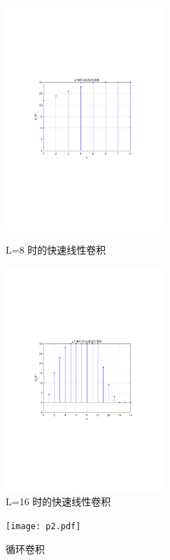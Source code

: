 \documentclass[12pt,AutoFakeBold]{article}
\begin{document}
\begin{figure}[htbp]
	\centering
	\begin{minipage}[t]{0.48\textwidth}
		\centering
		\includegraphics[width=6cm]{figure/p11.pdf}
		\caption{L=8 时的快速线性卷积} \label{fig:p11}
	\end{minipage}
	\begin{minipage}[t]{0.48\textwidth}
		\centering
		\includegraphics[width=6cm]{figure/p12.pdf}
		\caption{L=16 时的快速线性卷积} \label{fig:p12}
	\end{minipage}
\end{figure}

\begin{figure}[hbtp]
	\centering
	\texttt{[image: p2.pdf]}
	\caption{循环卷积}\label{fig:p2}
\end{figure}
\end{document}
